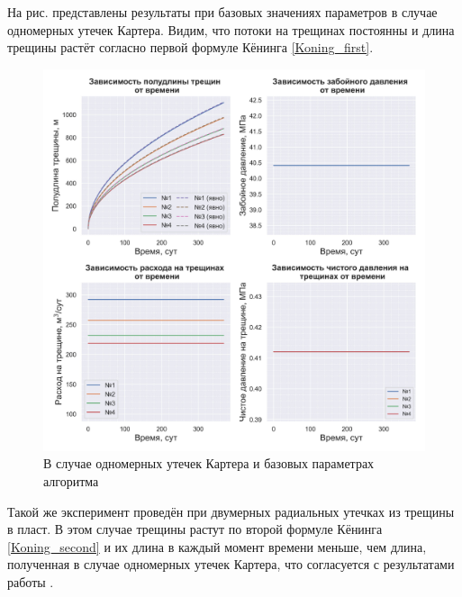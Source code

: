 \normalsize%
\endgroup

На рис. представлены результаты при базовых значениях параметров в случае одномерных утечек Картера.
Видим, что потоки на трещинах постоянны и длина трещины растёт согласно первой формуле Кёнинга \eqref{Koning_first}.

\begin{figure}[H] 
\center
\includegraphics[width=\linewidth]{images/myimage1.jpg}
\caption{В случае одномерных утечек Картера и базовых параметрах алгоритма} 
\label{fig:myimage1}
\end{figure}

Такой же эксперимент проведён при двумерных радиальных утечках из трещины в пласт.
В этом случае трещины растут по второй формуле Кёнинга \eqref{Koning_second} и их длина в каждый момент времени меньше, чем длина, полученная в случае одномерных утечек Картера, что согласуется с результатами работы \cite{hagoort}.

